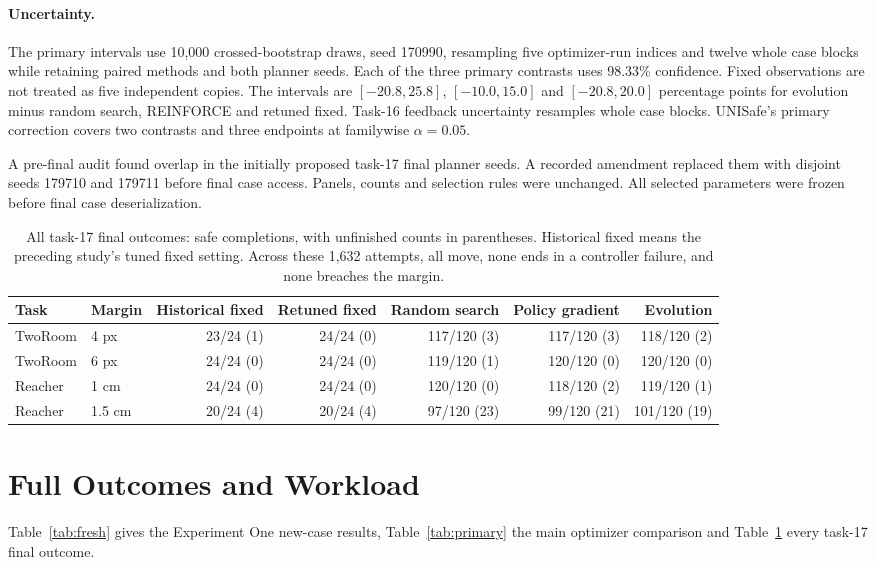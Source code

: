 \documentclass[sigconf,nonacm]{acmart}
\begin{document}
\paragraph{Uncertainty.} The primary intervals use 10,000 crossed-bootstrap
draws, seed 170990, resampling five optimizer-run indices and twelve whole
case blocks while retaining paired methods and both planner seeds. Each of
the three primary contrasts uses 98.33\% confidence. Fixed observations are
not treated as five independent copies. The intervals are
$[-20.8,25.8]$, $[-10.0,15.0]$ and $[-20.8,20.0]$ percentage points for
evolution minus random search, REINFORCE and retuned fixed. Task-16 feedback
uncertainty resamples whole case blocks. UNISafe's primary correction covers
two contrasts and three endpoints at familywise $\alpha=0.05$.

A pre-final audit found overlap in the initially proposed task-17 final
planner seeds. A recorded amendment replaced them with disjoint seeds
179710 and 179711 before final case access. Panels, counts and selection
rules were unchanged. All selected parameters were frozen before final
case deserialization.

\begin{table}[htbp]
\caption{All task-17 final outcomes: safe completions, with unfinished counts
in parentheses. Historical fixed means the preceding study's tuned fixed
setting. Across these 1,632 attempts, all move, none ends in a controller
failure, and none breaches the margin.}
\label{tab:optimizer-all}\centering\small
\begin{tabular}{llrrrrr}
\toprule
Task & Margin & Historical fixed & Retuned fixed & Random search & Policy gradient & Evolution \\
\midrule
TwoRoom & 4 px & 23/24 (1) & 24/24 (0) & 117/120 (3) & 117/120 (3) & 118/120 (2) \\
TwoRoom & 6 px & 24/24 (0) & 24/24 (0) & 119/120 (1) & 120/120 (0) & 120/120 (0) \\
Reacher & 1 cm & 24/24 (0) & 24/24 (0) & 120/120 (0) & 118/120 (2) & 119/120 (1) \\
Reacher & 1.5 cm & 20/24 (4) & 20/24 (4) & 97/120 (23) & 99/120 (21) & 101/120 (19) \\
\bottomrule
\end{tabular}
\end{table}

\section{Full Outcomes and Workload}\label{app:results}
Table~\ref{tab:fresh} gives the Experiment One new-case results,
Table~\ref{tab:primary} the main optimizer comparison and
Table~\ref{tab:optimizer-all} every task-17 final outcome.
\end{document}
